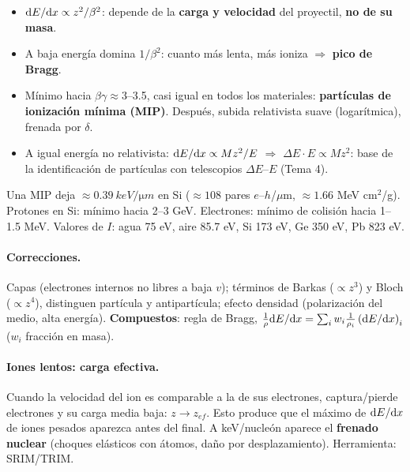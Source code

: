 \begin{clave}
\begin{itemize}
\item $\mathrm{d}E/\mathrm{d}x\propto z^2/\beta^2$: depende de la \textbf{carga y velocidad} del proyectil, \textbf{no de su masa}.
\item A baja energía domina $1/\beta^2$: cuanto más lenta, más ioniza $\Rightarrow$ \textbf{pico de Bragg}.
\item Mínimo hacia $\beta\gamma\approx3$--3.5, casi igual en todos los materiales:
\textbf{partículas de ionización mínima (MIP)}. Después, subida relativista suave (logarítmica), frenada por $\delta$.
\item A igual energía no relativista: $\mathrm{d}E/\mathrm{d}x\propto Mz^2/E$ $\Rightarrow$ $\Delta E\cdot E\propto Mz^2$:
base de la identificación de partículas con telescopios $\Delta E$--$E$ (Tema 4).
\end{itemize}
\end{clave}

\begin{dato}[MIP en Si]
Una MIP deja $\approx\SI{0.39}{keV/\micro m}$ en Si ($\approx108$ pares $e$--$h$/$\mu$m, $\approx 1.66$ MeV cm$^2$/g).
Protones en Si: mínimo hacia 2--3 GeV. Electrones: mínimo de colisión hacia 1--1.5 MeV.
Valores de $I$: agua 75 eV, aire 85.7 eV, Si 173 eV, Ge 350 eV, Pb 823 eV.
\end{dato}

\paragraph{Correcciones.} Capas (electrones internos no libres a baja $v$); términos de Barkas
($\propto z^3$) y Bloch ($\propto z^4$), distinguen partícula y antipartícula; efecto densidad
(polarización del medio, alta energía). \textbf{Compuestos}: regla de Bragg,
$\frac{1}{\rho}\mathrm{d}E/\mathrm{d}x=\sum_i w_i\frac{1}{\rho_i}\left(\mathrm{d}E/\mathrm{d}x\right)_i$ ($w_i$ fracción en masa).

\paragraph{Iones lentos: carga efectiva.} Cuando la velocidad del ion es comparable a la de sus
electrones, captura/pierde electrones y su carga media baja: $z\to z_{ef}$. Esto produce que el
máximo de $\mathrm{d}E/\mathrm{d}x$ de iones pesados aparezca antes del final. A keV/nucleón aparece el
\textbf{frenado nuclear} (choques elásticos con átomos, daño por desplazamiento). Herramienta: SRIM/TRIM.

